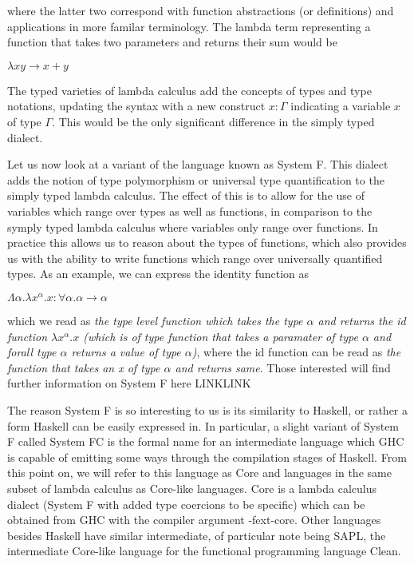 \documentclass[11pt]{article}
\begin{document}
\noindent where the latter two correspond with function abstractions (or
definitions) and applications in more familar terminology. The lambda term
representing a function that takes two parameters and returns their sum 
would be 

\begin{center} 
	\( \lambda x y \rightarrow x + y \)
\end{center}

\noindent The typed varieties of lambda calculus add the concepts of types and type
notations, updating the syntax with a new construct \(x:\Gamma \) indicating
a variable \(x\) of type \(\Gamma\). This would be the only significant 
difference in the simply typed dialect. 

Let us now look at a variant of the language known as System F. This dialect
adds the notion of type polymorphism or universal type quantification to 
the simply typed lambda calculus. The effect of this is to allow for the
use of variables which range over types as well as functions, in comparison
to the symply typed lambda calculus where variables only range over functions.
In practice this allows us to reason about the types of functions, which also
provides us with the ability to write functions which range over universally
quantified types. As an example, we can express the identity function as

\begin{center}
 \( \Lambda \alpha . \lambda x^\alpha . x : \forall \alpha . \alpha \rightarrow \alpha  \)
\end{center}

\noindent which we read as \emph{the type level function which takes 
the type \(\alpha\) and returns the id function \( \lambda x^\alpha . x \)
(which is of type \emph{ function that takes a paramater of type \( \alpha \) 
and forall type \(\alpha\) returns a value of type \( \alpha \)})}, where 
the id function can be read as \emph{the function that takes an x of 
type \( \alpha \) and returns same}. Those interested will find further information
on System F here LINKLINK

The reason System F is so interesting to us is its similarity to Haskell, or rather
a form Haskell can be easily expressed in. In particular, a slight variant of System F
called System FC is the formal name for an intermediate language which GHC is capable
of emitting some ways through the compilation stages of Haskell. From this point on, 
we will refer to this language as Core and languages in the same subset of lambda
calculus as Core-like languages. Core is a lambda calculus dialect (System F with
added type coercions to be specific) which can be obtained from GHC with the compiler
argument -fext-core. Other languages besides Haskell have similar intermediate, of
particular note being SAPL, the intermediate Core-like language for the functional
programming language Clean. 
\end{document}
